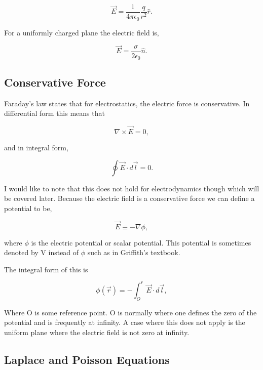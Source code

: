 \documentclass[preprint, review,12pt]{elsarticle}
\begin{document}
\begin{equation}
    \vec{E}= \frac{1}{4 \pi \epsilon_0} \frac{q}{r^2}\hat{r}.
\end{equation}

For a uniformly charged plane the electric field is,

\begin{equation}
    \vec{E} = \frac{\sigma}{2\epsilon_0}\hat{n}.
\end{equation}

\subsection{Conservative Force}

Faraday's law states that for electrostatics, the electric force is conservative. In differential form this means that

\begin{equation}
    \nabla \times \vec{E} = 0,
\end{equation}

and in integral form,

\begin{equation}
    \oint \vec{E} \cdot d\vec{l} = 0.
\end{equation}

I would like to note that this does not hold for electrodynamics though which will be covered later. Because the electric field is a conservative force we can define a potential to be,

\begin{equation}
    \vec{E} \equiv -\nabla \phi,
\end{equation}

where $\phi$ is the electric potential or scalar potential. This potential is sometimes denoted by V instead of $\phi$ such as in Griffith's textbook.

The integral form of this is

\begin{equation}
    \phi(\vec{r}) = - \int_O^r \vec{E}\cdot d\vec{l},
\end{equation}

Where O is some reference point. O is normally where one defines the zero of the potential and is frequently at infinity. A case where this does not apply is the uniform plane where the electric field is not zero at infinity. 

\subsection{Laplace and Poisson Equations}
\end{document}
